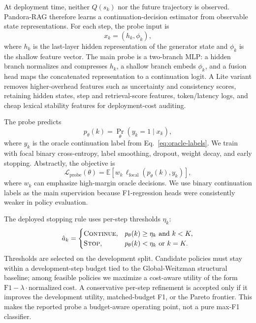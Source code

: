 \documentclass{article}
\newcommand{\method}{Pandora-RAG}
\begin{document}
At deployment time, neither $Q(s_k)$ nor the future trajectory is observed. \method{} therefore learns a continuation-decision estimator from observable state representations. For each step, the probe input is
\[
  x_k=(h_k,\phi_k),
\]
where $h_k$ is the last-layer hidden representation of the generator state and $\phi_k$ is the shallow feature vector. The main probe is a two-branch MLP: a hidden branch normalizes and compresses $h_k$, a shallow branch embeds $\phi_k$, and a fusion head maps the concatenated representation to a continuation logit. A Lite variant removes higher-overhead features such as uncertainty and consistency scores, retaining hidden states, step and retrieval-score features, token/latency logs, and cheap lexical stability features for deployment-cost auditing.

The probe predicts
\begin{equation}
  p_\theta(k)=\Pr_\theta(y_k=1\mid x_k),
  \label{eq:probe-prob}
\end{equation}
where $y_k$ is the oracle continuation label from Eq.~\eqref{eq:oracle-labels}. We train with focal binary cross-entropy, label smoothing, dropout, weight decay, and early stopping. Abstractly, the objective is
\begin{equation}
  \mathcal{L}_{\mathrm{probe}}(\theta)
  =
  \mathbb{E}\left[
    w_k\,
    \ell_{\mathrm{focal}}\left(p_\theta(k),y_k\right)
  \right],
  \label{eq:probe-loss}
\end{equation}
where $w_k$ can emphasize high-margin oracle decisions. We use binary continuation labels as the main supervision because F1-regression heads were consistently weaker in policy evaluation.

The deployed stopping rule uses per-step thresholds $\eta_k$:
\begin{equation}
  \hat a_k=
  \begin{cases}
    \textsc{Continue}, & p_\theta(k)\ge \eta_k \text{ and } k<K,\\
    \textsc{Stop}, & p_\theta(k)<\eta_k \text{ or } k=K .
  \end{cases}
  \label{eq:probe-policy}
\end{equation}
Thresholds are selected on the development split. Candidate policies must stay within a development-step budget tied to the Global-Weitzman structural baseline; among feasible policies we maximize a cost-aware utility of the form $\mathrm{F1}-\lambda\cdot\mathrm{normalized\ cost}$. A conservative per-step refinement is accepted only if it improves the development utility, matched-budget F1, or the Pareto frontier. This makes the reported probe a budget-aware operating point, not a pure max-F1 classifier.
\end{document}
